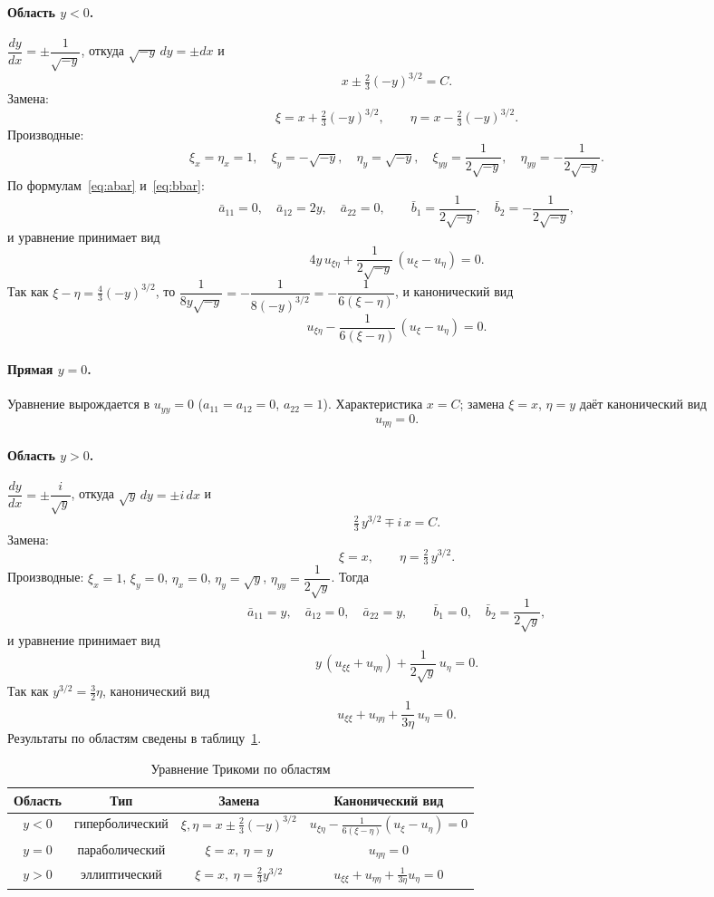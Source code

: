 \documentclass[a4paper,12pt]{article}
\begin{document}
\paragraph{Область $y<0$.}
$\dfrac{dy}{dx}=\pm\dfrac{1}{\sqrt{-y}}$, откуда $\sqrt{-y}\,dy=\pm dx$ и
\[
  x\pm\tfrac23(-y)^{3/2}=C.
\]
Замена:
\[
  \xi=x+\tfrac23(-y)^{3/2},\qquad \eta=x-\tfrac23(-y)^{3/2}.
\]
Производные:
\[
  \xi_x=\eta_x=1,\quad \xi_y=-\sqrt{-y},\quad \eta_y=\sqrt{-y},\quad
  \xi_{yy}=\frac{1}{2\sqrt{-y}},\quad \eta_{yy}=-\frac{1}{2\sqrt{-y}}.
\]
По формулам~\eqref{eq:abar} и~\eqref{eq:bbar}:
\[
  \bar a_{11}=0,\quad \bar a_{12}=2y,\quad \bar a_{22}=0,\qquad
  \bar b_1=\frac{1}{2\sqrt{-y}},\quad \bar b_2=-\frac{1}{2\sqrt{-y}},
\]
и уравнение принимает вид
\[
  4y\,u_{\xi\eta}+\frac{1}{2\sqrt{-y}}\,(u_\xi-u_\eta)=0.
\]
Так как $\xi-\eta=\tfrac43(-y)^{3/2}$, то $\dfrac{1}{8y\sqrt{-y}}=-\dfrac{1}{8(-y)^{3/2}}=-\dfrac{1}{6(\xi-\eta)}$,
и канонический вид
\[
  u_{\xi\eta}-\frac{1}{6(\xi-\eta)}\,(u_\xi-u_\eta)=0.
\]

\paragraph{Прямая $y=0$.} Уравнение вырождается в $u_{yy}=0$
($a_{11}=a_{12}=0$, $a_{22}=1$). Характеристика $x=C$; замена $\xi=x$, $\eta=y$
даёт канонический вид
\[
  u_{\eta\eta}=0.
\]

\paragraph{Область $y>0$.}
$\dfrac{dy}{dx}=\pm\dfrac{i}{\sqrt{y}}$, откуда $\sqrt{y}\,dy=\pm i\,dx$ и
\[
  \tfrac23\,y^{3/2}\mp i\,x=C.
\]
Замена:
\[
  \xi=x,\qquad \eta=\tfrac23\,y^{3/2}.
\]
Производные: $\xi_x=1$, $\xi_y=0$, $\eta_x=0$, $\eta_y=\sqrt{y}$,
$\eta_{yy}=\dfrac{1}{2\sqrt{y}}$. Тогда
\[
  \bar a_{11}=y,\quad \bar a_{12}=0,\quad \bar a_{22}=y,\qquad
  \bar b_1=0,\quad \bar b_2=\frac{1}{2\sqrt{y}},
\]
и уравнение принимает вид
\[
  y\,(u_{\xi\xi}+u_{\eta\eta})+\frac{1}{2\sqrt{y}}\,u_\eta=0.
\]
Так как $y^{3/2}=\tfrac32\eta$, канонический вид
\[
  u_{\xi\xi}+u_{\eta\eta}+\frac{1}{3\eta}\,u_\eta=0.
\]
Результаты по областям сведены в таблицу~\ref{tab:tricomi}.

\begin{table}[H]
\centering\small
\renewcommand{\arraystretch}{1.5}
\setlength{\tabcolsep}{4pt}
\caption{Уравнение Трикоми по областям}
\label{tab:tricomi}
\begin{tabular}{@{}cccc@{}}
\toprule
Область & Тип & Замена & Канонический вид\\
\midrule
$y<0$ & гиперболический & $\xi,\eta=x\pm\frac23(-y)^{3/2}$ & $u_{\xi\eta}-\frac{1}{6(\xi-\eta)}(u_\xi-u_\eta)=0$\\
$y=0$ & параболический  & $\xi=x,\ \eta=y$                 & $u_{\eta\eta}=0$\\
$y>0$ & эллиптический   & $\xi=x,\ \eta=\frac23y^{3/2}$    & $u_{\xi\xi}+u_{\eta\eta}+\frac{1}{3\eta}u_\eta=0$\\
\bottomrule
\end{tabular}
\end{table}
\end{document}
